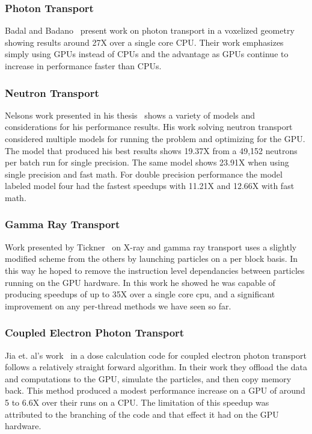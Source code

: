 \subsubsection*{\textbf{Photon Transport}}
%
Badal and Badano~\cite{badal2009accelerating} present work on photon transport in a voxelized geometry showing results around 27X over a single core CPU.
%
Their work emphasizes simply using GPUs instead of CPUs and the advantage as GPUs continue to increase in performance faster than CPUs.
%

\subsubsection*{\textbf{Neutron Transport}}
%
Nelsons work presented in his thesis~\cite{nelson2009monte} shows a variety of models and considerations for his performance results.
%
His work solving neutron transport considered multiple models for running the problem and optimizing for the GPU.
%
The model that produced his best results shows 19.37X from a 49,152 neutrons per batch run for single precision.
%
The same model shows 23.91X when using single precision and fast math.
%
For double precision performance the model labeled model four had the fastest speedups with 11.21X and 12.66X with fast math.
%

\subsubsection*{\textbf{Gamma Ray Transport}}
%
Work presented by Tickner~\cite{tickner2010monte} on X-ray and gamma ray transport uses a slightly modified scheme from the others by launching particles on a per block basis.
%
In this way he hoped to remove the instruction level dependancies between particles running on the GPU hardware.
%
In this work he showed he was capable of producing speedups of up to 35X over a single core cpu, and a significant improvement on any per-thread methods we have seen so far.
%

\subsubsection*{\textbf{Coupled Electron Photon Transport}}
%
Jia et. al's  work~\cite{jia2010development} in a dose calculation code for coupled electron photon transport follows a relatively straight forward algorithm.
%
In their work they offload the data and computations to the GPU, simulate the particles, and then copy memory back.
This method produced a modest performance increase on a GPU of around 5 to 6.6X over their runs on a CPU.
%
The limitation of this speedup was attributed to the branching of the code and that effect it had on the GPU hardware.

